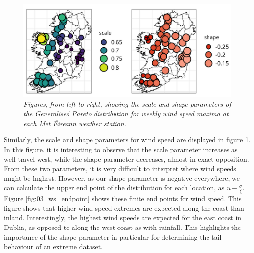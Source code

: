 \documentclass{article}
\numberwithin{equation}{section}
\begin{document}
\begin{figure}[H]
    \centering
    \includegraphics[width = 0.9\linewidth]{plots/033_gpd_ws_crop.png}
    \caption{\emph{Figures, from left to right, showing the scale and shape parameters of the Generalised Pareto distribution for weekly wind speed maxima at each Met Éireann weather station.}}
    \label{fig:03_gpd_ws}
\end{figure}

Similarly, the scale and shape parameters for wind speed are displayed in figure \ref{fig:03_gpd_ws}.
In this figure, it is interesting to observe that the scale parameter increases as well travel west, while the shape parameter decreases, almost in exact opposition.
From these two parameters, it is very difficult to interpret where wind speeds might be highest. 
However, as our shape parameter is negative everywhere, we can calculate the upper end point of the distribution for each location, as $u - \frac{\sigma}{\xi}$.
Figure \ref{fig:03_ws_endpoint} shows these finite end points for wind speed.
This figure shows that higher wind speed extremes are expected along the coast than inland. 
Interestingly, the highest wind speeds are expected for the east coast in Dublin, as opposed to along the west coast as with rainfall.
This highlights the importance of the shape parameter in particular for determining the tail behaviour of an extreme dataset.
\end{document}
